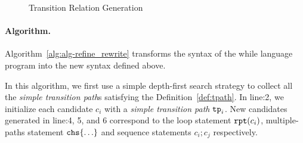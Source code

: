 \begin{figure}
    \caption{Transition Relation Generation}
    \label{fig:transition-relation-rule}
\end{figure}


\paragraph{Algorithm.}
Algorithm~\ref{alg:alg-refine_rewrite} transforms the syntax of the while language program 
into the new syntax defined above.

In this algorithm, we first use a simple depth-first search strategy to collect all the \emph{simple transition path}s satisfying the Definition~\ref{def:tpath}. 
In line:2, we initialize each candidate $c_i$ with a \emph{simple transition path} $\mathtt{tp}_i$. 
New candidates generated in line:4, 5, and 6 correspond to the loop statement $\mathtt{rpt}(c_i)$, multiple-paths statement $\rpchoose{\ldots}$ and sequence statements $c_i; c_j$ respectively.

